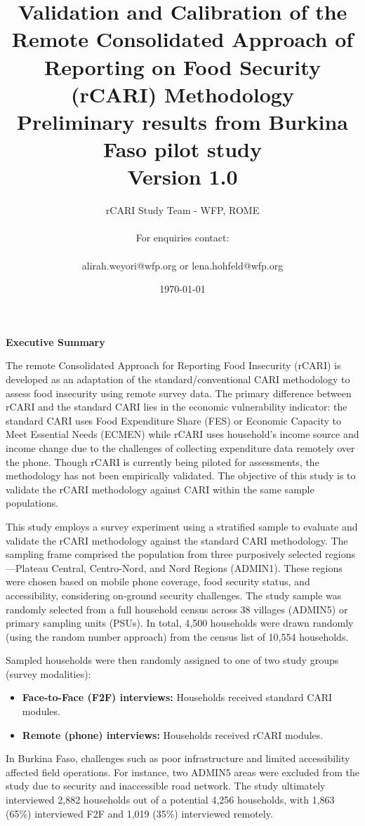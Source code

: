 \documentclass[11pt,harvard]{article}
\author{rCARI Study Team - WFP, ROME \\	\\For enquiries contact:\\		\\alirah.weyori@wfp.org or lena.hohfeld@wfp.org}
\date{\today}
\title{Validation and Calibration of the Remote Consolidated Approach of Reporting on Food Security (rCARI) Methodology 
	\\ {\normalsize Preliminary results from Burkina Faso pilot study} 
	\\{\normalsize{Version 1.0}} }
\begin{document}
	\maketitle \vspace{-1cm}
	\onehalfspacing
	\pagebreak
	\setlength{\parskip}{6pt} %
	\tableofcontents
	\pagebreak
	
	
	\textbf{Executive Summary}
	
	The remote Consolidated Approach for Reporting Food Insecurity (rCARI) is developed as an adaptation of the standard/conventional CARI methodology to assess food insecurity using remote survey data. The primary difference between rCARI and the standard CARI lies in the economic vulnerability indicator: the standard CARI uses Food Expenditure Share (FES) or Economic Capacity to Meet Essential Needs (ECMEN) while rCARI uses household’s income source and income change due to the challenges of collecting expenditure data remotely over the phone. Though rCARI is currently being piloted for assessments, the methodology has not been empirically validated. The objective of this study is to validate the rCARI methodology against CARI within the same sample populations.

	This study employs a survey experiment using a stratified sample to evaluate and validate the rCARI methodology against the standard CARI methodology. The sampling frame comprised the population from  three purposively selected regions—Plateau Central, Centro-Nord, and Nord Regions (ADMIN1). These regions were chosen based on mobile phone coverage, food security status, and accessibility, considering on-ground security challenges. The study sample was randomly selected from a full household census across 38 villages (ADMIN5) or primary sampling units (PSUs). In total, 4,500 households were drawn randomly (using the random number approach) from the census list of 10,554 households. 

	Sampled households were then randomly assigned to one of two study groups (survey modalities):
	\begin{itemize}
		\item [1.] \textbf{Face-to-Face (F2F) interviews:} Households received standard CARI modules.
		\item [2.] \textbf{Remote (phone) interviews:} Households received rCARI modules.
	\end{itemize}

	In Burkina Faso, challenges such as poor infrastructure and limited accessibility affected field operations. For instance, two ADMIN5 areas were excluded from the study due to security and inaccessible road network. The study ultimately interviewed 2,882 households out of a potential 4,256 households, with 1,863 (65\%) interviewed F2F and 1,019 (35\%) interviewed remotely.
\end{document}
